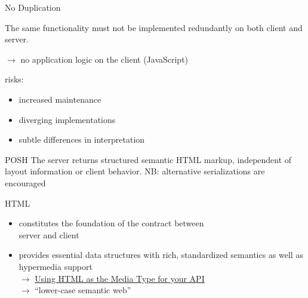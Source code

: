 \documentclass{beamer}
\begin{document}
\begin{frame}{No Duplication}

  The same functionality must not be implemented redundantly on both client and server.


  \vspace*{0.25cm}
  \ensuremath{\rightarrow} no application logic on the client (JavaScript)

  \vspace*{0.5cm}
  risks:
  \begin{itemize}
    \item increased maintenance
    \item diverging implementations
    \item subtle differences in interpretation
  \end{itemize}
\end{frame}

\begin{frame}{POSH}
  The server returns structured semantic HTML markup, independent of layout information or client behavior.
  \vspace*{0.25cm}
  NB: alternative serializations are encouraged
\end{frame}

\begin{frame}{HTML}
  \begin{itemize}
    \item constitutes the foundation of the contract between \\ server and client
    \item provides essential data structures with rich, standardized semantics as well as hypermedia support
      \\
      \vspace*{0.25cm}
      \ensuremath{\rightarrow}
      \href{http://codeartisan.blogspot.de/2012/07/using-html-as-media-type-for-your-api.html}{Using HTML as the Media Type for your API}
      \\
      \vspace*{0.25cm}
      \ensuremath{\rightarrow}
      ``lower-case semantic web''
  \end{itemize}
\end{frame}
\end{document}
